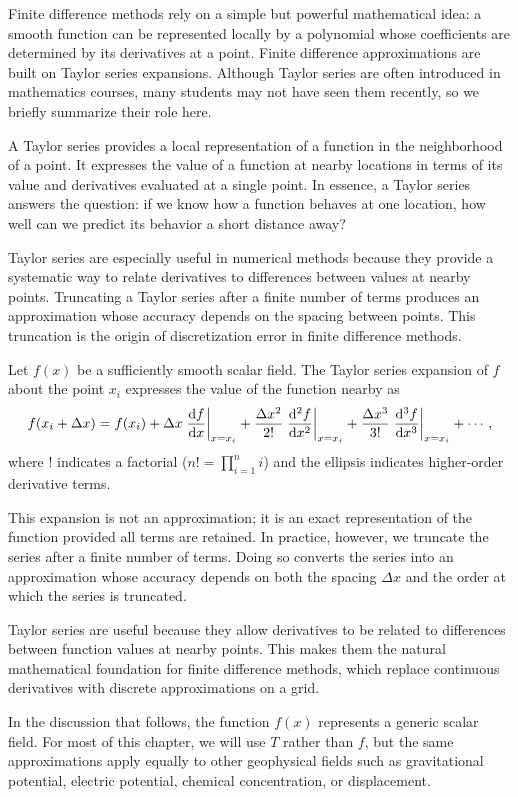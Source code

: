 Finite difference methods rely on a simple but powerful mathematical idea: a smooth function can be represented locally by a polynomial whose coefficients are determined by its derivatives at a point.  Finite difference approximations are built on Taylor series expansions.  Although Taylor series are often introduced in mathematics courses, many students may not have seen them recently, so we briefly summarize their role here.

A Taylor series provides a local representation of a function in the neighborhood of a point. It expresses the value of a function at nearby locations in terms of its value and derivatives evaluated at a single point.  In essence, a Taylor series answers the question: if we know how a function behaves at one location, how well can we predict its behavior a short distance away?

Taylor series are especially useful in numerical methods because they provide a systematic way to relate derivatives to differences between values at nearby points. Truncating a Taylor series after a finite number of terms produces an approximation whose accuracy depends on the spacing between points. This truncation is the origin of discretization error in finite difference methods.

Let $f(x)$ be a sufficiently smooth scalar field. The Taylor series expansion
of $f$ about the point $x_i$ expresses the value of the function nearby as
\[
f(x_i + \Delta x)
=
f(x_i)
+ \Delta x \eval{\dv{f}{x}}_{x=x_i}
+ \frac{\Delta x^2}{2!} \eval{\dv[2]{f}{x}}_{x=x_i}
+ \frac{\Delta x^3}{3!} \eval{\dv[3]{f}{x}}_{x=x_i}
+ \cdots ,
\]
where $!$ indicates a factorial ($n! = \prod_{i=1}^n i$) and the ellipsis indicates higher-order derivative terms.

This expansion is not an approximation; it is an exact representation of the function provided all terms are retained. In practice, however, we truncate the series after a finite number of terms. Doing so converts the series into an approximation whose accuracy depends on both the spacing $\Delta x$ and the order at which the series is truncated.

Taylor series are useful because they allow derivatives to be related to differences between function values at nearby points. This makes them the natural mathematical foundation for finite difference methods, which replace continuous derivatives with discrete approximations on a grid.

In the discussion that follows, the function $f(x)$ represents a generic scalar field. For most of this chapter, we will use $T$ rather than $f$, but the same approximations apply equally to other geophysical fields such as gravitational potential, electric potential, chemical concentration, or displacement.


